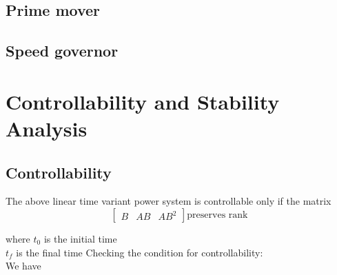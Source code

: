\documentclass[journal]{IEEEtran}
\begin{document}
\subsection{Prime mover}
\subsection{Speed governor}
\section{Controllability and Stability Analysis}
\subsection{Controllability} The above linear time variant power system is controllable only if the matrix \\
\begin{equation}
\begin{bmatrix}
B & AB & AB^2 
\end{bmatrix}
\text{preserves rank}
\end{equation}

where $t_{0}$ is the initial time \\
$t_{f}$ is the final time
Checking the condition for controllability: \\
We have \\
\end{document}
